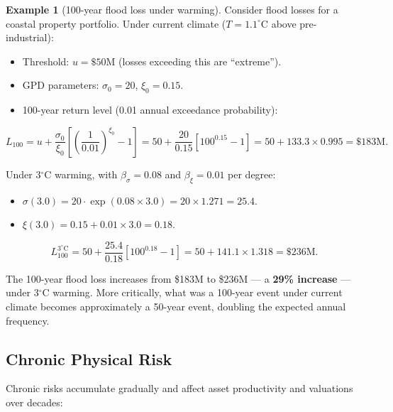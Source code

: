 \documentclass[11pt, a4paper]{article}
\theoremstyle{definition}
\newtheorem{example}{Example}[section]
\theoremstyle{plain}
\theoremstyle{remark}
\begin{document}
\begin{example}[100-year flood loss under warming]\label{ex:flood-gpd}
Consider flood losses for a coastal property portfolio.
Under current climate ($T = 1.1^\circ$C above pre-industrial):
\begin{itemize}
    \item Threshold: $u = \$50$M (losses exceeding this are ``extreme'').
    \item GPD parameters: $\sigma_0 = 20$, $\xi_0 = 0.15$.
    \item 100-year return level (0.01 annual exceedance probability):
\end{itemize}
\begin{equation}
    L_{100} = u + \frac{\sigma_0}{\xi_0}
    \left[\left(\frac{1}{0.01}\right)^{\xi_0} - 1\right]
    = 50 + \frac{20}{0.15}\left[100^{0.15} - 1\right]
    = 50 + 133.3 \times 0.995 = \$183\text{M}.
\end{equation}

Under 3$^\circ$C warming, with $\beta_\sigma = 0.08$ and $\beta_\xi = 0.01$
per degree:
\begin{itemize}
    \item $\sigma(3.0) = 20 \cdot \exp(0.08 \times 3.0) = 20 \times 1.271 = 25.4$.
    \item $\xi(3.0) = 0.15 + 0.01 \times 3.0 = 0.18$.
\end{itemize}
\begin{equation}
    L_{100}^{3^\circ\text{C}} = 50 + \frac{25.4}{0.18}
    \left[100^{0.18} - 1\right]
    = 50 + 141.1 \times 1.318 = \$236\text{M}.
\end{equation}

The 100-year flood loss increases from \$183M to \$236M --- a \textbf{29\% increase}
--- under 3$^\circ$C warming.
More critically, what was a 100-year event under current climate becomes
approximately a 50-year event, doubling the expected annual frequency.
\end{example}

\subsection{Chronic Physical Risk}

Chronic risks accumulate gradually and affect asset productivity and valuations
over decades:
\end{document}
